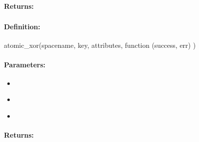 \paragraph{Returns:}


\pagebreak
\subsubsection{}
\label{api:nodejs:atomic_xor}


\paragraph{Definition:}
\begin{javascriptcode}
atomic_xor(spacename, key, attributes, function (success, err) {})
\end{javascriptcode}
\paragraph{Parameters:}
\begin{itemize}[noitemsep]
\item {}\\

\item {}\\

\item {}\\

\end{itemize}

\paragraph{Returns:}


\pagebreak
\subsubsection{}
\label{api:nodejs:cond_atomic_xor}


